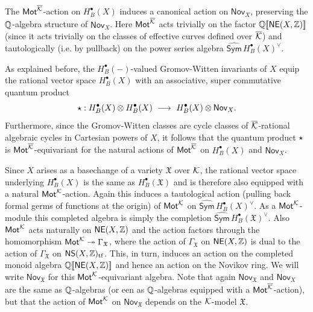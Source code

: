 \documentclass[twoside,leqno]{article}
\numberwithin{equation}{section}
\theoremstyle{plain}
\theoremstyle{definition}
\begin{document}
The $\mathsf{Mot}^{\overline{\mathcal K}}$-action on $H^{\bullet}_{B}(X)$
induces a canonical action on $\mathsf{Nov}_{X}$, preserving the
$\mathbb Q$-algebra structure of $\mathsf{Nov}_{X}$. Here $\mathsf{Mot}^{\overline{\mathcal K}}$
acts trivially on the factor $\mathbb Q[\![\mathsf{NE}(X,\mathbb Z)]\!]$ (since it
acts trivially on the classes of effective curves defined over
$\overline{\mathcal K}$) and tautologically (i.e. by pullback) on the power series
algebra $\widehat{\mathsf{Sym}}\, H^{\bullet}_{B}(X)^{\vee}$.


As explained before, the $H^{\bullet}_{B}(-)$-valued
Gromov-Witten invariants of $X$
equip the rational vector space $H^{\bullet}_{B}(X)$ with an associative,
super commutative quantum
product
\[
\qup : H^{\bullet}_{B}(X)\otimes H^{\bullet}_{B}(X)
\ \longrightarrow
\ 
H^{\bullet}_{B}(X)\otimes \mathsf{Nov}_{X}.
\]
Furthermore, since the Gromov-Witten classes are cycle classes of
$\overline{\mathcal K}$-rational
algebraic cycles in Cartesian powers of $X$, it follows that the
quantum product $\star$ is $\mathsf{Mot}^{\overline{\mathcal K}}$-equivariant for the
natural actions of $\mathsf{Mot}^{\overline{\mathcal K}}$ on $H^{\bullet}_{B}(X)$ and
$\mathsf{Nov}_{X}$. 

Since $X$ arises as a basechange of a variety $\mathfrak{X}$ over
$\mathcal K$, the rational vector space underlying $H^{\bullet}_{B}(X)$ is
the same as $H^{\bullet}_{B}(\mathfrak{X})$ and is therefore also
equipped with a natural $\mathsf{Mot}^{\mathcal K}$-action. Again this induces a
tautological action (pulling back formal germs of functions at the
origin) of $\mathsf{Mot}^{\mathcal K}$ on $\widehat{\mathsf{Sym}}\,
H^{\bullet}_{B}(X)^{\vee}$. As a $\mathsf{Mot}^{\mathcal K}$-module this completed
algebra is simply the completion $\widehat{\mathsf{Sym}}\,
H^{\bullet}_{B}(\mathfrak{X})^{\vee}$. Also $\mathsf{Mot}^{\mathcal K}$ acts
naturally on $\mathsf{NE}(X,\mathbb Z)$ and the action factors through the
homomorphism $\mathsf{Mot}^{\mathcal K} \twoheadrightarrow \Gamma_{\mathfrak{X}}$,
where the action of $\Gamma_{\mathfrak{X}}$ on $\mathsf{NE}(X,\mathbb Z)$
is dual to the action of $\Gamma_{\mathfrak{X}}$ on
$\mathsf{NS}(X,\mathbb Z)_{\operatorname{tf}}$. This, in turn, induces an action on
the completed monoid algebra $\mathbb Q[\![\mathsf{NE}(X,\mathbb Z)]\!]$ and hence
an action on the Novikov ring. We will write
$\mathsf{Nov}_{\mathfrak{X}}$ for this $\mathsf{Mot}^{\mathcal K}$-equivariant
algebra. Note that again $\mathsf{Nov}_{\mathfrak{X}}$ and
$\mathsf{Nov}_{X}$ are the same as $\mathbb Q$-algebras (or een as
$\mathbb Q$-algebras equipped with a $\mathsf{Mot}^{\overline{\mathcal K}}$-action), but that the
action of $\mathsf{Mot}^{\mathcal K}$ on $\mathsf{Nov}_{\mathfrak{X}}$ depends on
the $\mathcal K$-model $\mathfrak{X}$.
\end{document}
